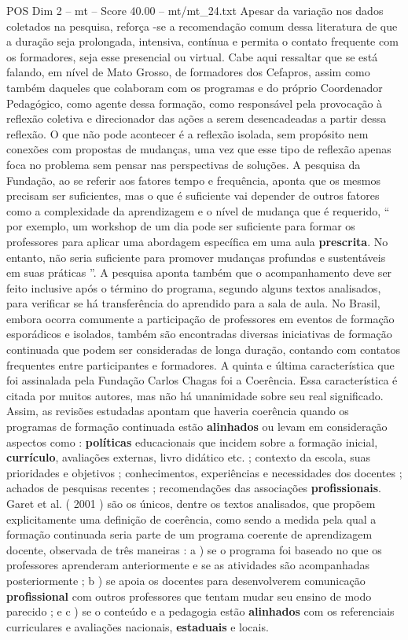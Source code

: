 \begin{textsample}{POS Dim 2 – mt – Score 40.00 – mt/mt\_24.txt}
Apesar da variação nos dados coletados na pesquisa, reforça -se a recomendação comum dessa literatura de que a duração seja prolongada, intensiva, contínua e permita o contato frequente com os formadores, seja esse presencial ou virtual.
Cabe aqui ressaltar que se está falando, em nível de Mato Grosso, de formadores dos Cefapros, assim como também daqueles que colaboram com os programas e do próprio Coordenador Pedagógico, como agente dessa formação, como responsável pela provocação à reflexão coletiva e direcionador das ações a serem desencadeadas a partir dessa reflexão.
O que não pode acontecer é a reflexão isolada, sem propósito nem conexões com propostas de mudanças, uma vez que esse tipo de reflexão apenas foca no problema sem pensar nas perspectivas de soluções.
A pesquisa da Fundação, ao se referir aos fatores tempo e frequência, aponta que os mesmos precisam ser suficientes, mas o que é suficiente vai depender de outros fatores como a complexidade da aprendizagem e o nível de mudança que é requerido, “ por exemplo, um workshop de um dia pode ser suficiente para formar os professores para aplicar uma abordagem específica em uma aula \textbf{prescrita}.
No entanto, não seria suficiente para promover mudanças profundas e sustentáveis em suas práticas ”.
A pesquisa aponta também que o acompanhamento deve ser feito inclusive após o término do programa, segundo alguns textos analisados, para verificar se há transferência do aprendido para a sala de aula.
No Brasil, embora ocorra comumente a participação de professores em eventos de formação esporádicos e isolados, também são encontradas diversas iniciativas de formação continuada que podem ser consideradas de longa duração, contando com contatos frequentes entre participantes e formadores.
A quinta e última característica que foi assinalada pela Fundação Carlos Chagas foi a Coerência.
Essa característica é citada por muitos autores, mas não há unanimidade sobre seu real significado.
Assim, as revisões estudadas apontam que haveria coerência quando os programas de formação continuada estão \textbf{alinhados} ou levam em consideração aspectos como : \textbf{políticas} educacionais que incidem sobre a formação inicial, \textbf{currículo}, avaliações externas, livro didático etc. ; contexto da escola, suas prioridades e objetivos ; conhecimentos, experiências e necessidades dos docentes ; achados de pesquisas recentes ; recomendações das associações \textbf{profissionais}.
Garet et al. ( 2001 ) são os únicos, dentre os textos analisados, que propõem explicitamente uma definição de coerência, como sendo a medida pela qual a formação continuada seria parte de um programa coerente de aprendizagem docente, observada de três maneiras : a ) se o programa foi baseado no que os professores aprenderam anteriormente e se as atividades são acompanhadas posteriormente ; b ) se apoia os docentes para desenvolverem comunicação \textbf{profissional} com outros professores que tentam mudar seu ensino de modo parecido ; e c ) se o conteúdo e a pedagogia estão \textbf{alinhados} com os referenciais curriculares e avaliações nacionais, \textbf{estaduais} e locais.

\end{textsample}
